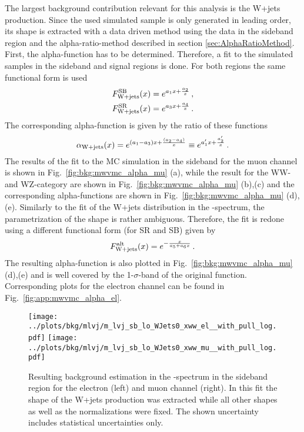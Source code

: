 The largest background contribution relevant for this analysis is the W+jets production. Since the used simulated sample is only generated in leading order, its shape is extracted with a data driven method using the data in the sideband region and the alpha-ratio-method described in section \ref{sec:AlphaRatioMethod}. First, the alpha-function has to be determined. Therefore, a fit to the simulated samples in the sideband and signal regions is done. For both regions the same functional form is used
\begin{align}
F_{\rm W+jets}^{\rm SB}(x)=e^{a_1x+\frac{a_2}{x}} \, , \\
F_{\rm W+jets}^{\rm SR}(x)=e^{a_3x+\frac{a_4}{x}} \, . \label{eq:bkg:wjetssig}
\end{align}
The corresponding alpha-function is given by the ratio of these functions
\begin{equation}
\alpha_{\rm W+jets}(x) = e^{(a_1-a_3)x+\frac{(a_2-a_4)}{x}} \equiv e^{a_1'x+\frac{a_2'}{x}} \, .
\end{equation}
The results of the fit to the MC simulation in the sideband for the muon channel is shown in Fig.~\ref{fig:bkg:mwvmc_alpha_mu} (a), while the result for the WW- and WZ-category are shown in Fig.~\ref{fig:bkg:mwvmc_alpha_mu} (b),(c) and the corresponding alpha-functions are shown in Fig.~\ref{fig:bkg:mwvmc_alpha_mu} (d),(e). Similarly to the fit of the W+jets distribution in the \Mpr -spectrum, the parametrization of the shape is rather ambiguous. Therefore, the fit is redone using a different functional form (for SR and SB) given by
\begin{equation}
F_{\rm W+jets}^{\rm alt}(x)=e^{-\frac{x}{a_5+a_6x}} \, .
\end{equation}
The resulting alpha-function is also plotted in Fig.~\ref{fig:bkg:mwvmc_alpha_mu} (d),(e) and is well covered by the 1-$\sigma$-band of the original function. Corresponding plots for the electron channel can be found in Fig.~\ref{fig:app:mwvmc_alpha_el}.\\
\begin{figure}
	\centering
	\texttt{[image: ../plots/bkg/mlvj/m\_lvj\_sb\_lo\_WJets0\_xww\_el\_\_with\_pull\_log.pdf]}
	\texttt{[image: ../plots/bkg/mlvj/m\_lvj\_sb\_lo\_WJets0\_xww\_mu\_\_with\_pull\_log.pdf]}
	\caption[Resulting background estimation in the \MWV -spectrum in the sideband region]{Resulting background estimation in the \MWV -spectrum in the sideband region for the electron (left) and muon channel (right). In this fit the shape of the W+jets production was extracted while all other shapes as well as the normalizations were fixed. The shown uncertainty includes statistical uncertainties only.}	
	\label{fig:bkg:data_sb}
\end{figure}
